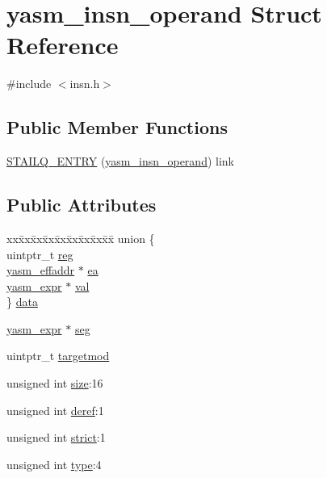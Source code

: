\hypertarget{structyasm__insn__operand}{\section{yasm\-\_\-insn\-\_\-operand Struct Reference}
\label{structyasm__insn__operand}
}


{\ttfamily \#include $<$insn.\-h$>$}

\subsection*{Public Member Functions}
\begin{DoxyCompactItemize}
\item 
\hyperlink{structyasm__insn__operand_a0a2715124710cf75517a43bce24ceecd}{S\-T\-A\-I\-L\-Q\-\_\-\-E\-N\-T\-R\-Y} (\hyperlink{structyasm__insn__operand}{yasm\-\_\-insn\-\_\-operand}) link
\end{DoxyCompactItemize}
\subsection*{Public Attributes}
\begin{DoxyCompactItemize}
\item 
\begin{tabbing}
xx\=xx\=xx\=xx\=xx\=xx\=xx\=xx\=xx\=\kill
union \{\\
\>uintptr\_t \hyperlink{structyasm__insn__operand_a212cb5db883ebf1f1ecc5972ee7ba85b}{reg}\\
\>\hyperlink{structyasm__effaddr}{yasm\_effaddr} $\ast$ \hyperlink{structyasm__insn__operand_a5da6f0008883b0ff45c15cf2b62b8681}{ea}\\
\>\hyperlink{structyasm__expr}{yasm\_expr} $\ast$ \hyperlink{structyasm__insn__operand_af9d95be1e0d44cd63c9f2f9eb7eb4096}{val}\\
\} \hyperlink{structyasm__insn__operand_ac68778c6b44bd99608852f865a4586a9}{data}\\

\end{tabbing}\item 
\hyperlink{structyasm__expr}{yasm\-\_\-expr} $\ast$ \hyperlink{structyasm__insn__operand_ab099b11f4b22240a783e1e4eec1f186f}{seg}
\item 
uintptr\-\_\-t \hyperlink{structyasm__insn__operand_a33caa5eb90eee1ef2fee73618796096a}{targetmod}
\item 
unsigned int \hyperlink{structyasm__insn__operand_ad6a8305ba606635ded3270169854963b}{size}\-:16
\item 
unsigned int \hyperlink{structyasm__insn__operand_a817439e55bbb3e6c81a2ef08e96fc5cf}{deref}\-:1
\item 
unsigned int \hyperlink{structyasm__insn__operand_a9115b46ccbd8239fd7c634d783e25a03}{strict}\-:1
\item 
unsigned int \hyperlink{structyasm__insn__operand_ae12aee95f5ee1e89d39a38ef84f6a638}{type}\-:4
\end{DoxyCompactItemize}


